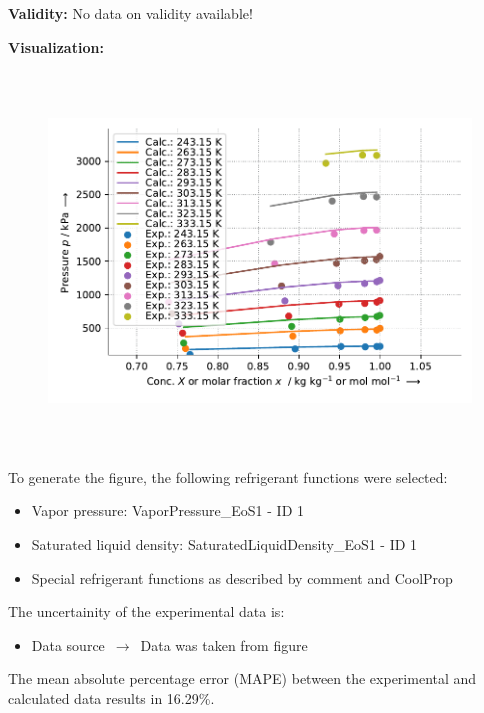 \textbf{Validity:}
\newline
No data on validity available!
\newline

\textbf{Visualization:}
%
\begin{figure}[!htp]
{\noindent\includegraphics[height=10cm, keepaspectratio]{figs/abs/abs_R-125_lubricant_POE_WilsonFixedDl_1.pdf}}
\end{figure}
%

To generate the figure, the following refrigerant functions were selected:
\begin{itemize}
\item Vapor pressure: VaporPressure\_EoS1 - ID 1
\item Saturated liquid density: SaturatedLiquidDensity\_EoS1 - ID 1
\item Special refrigerant functions as described by comment and CoolProp
\end{itemize}

The uncertainity of the experimental data is:
\begin{itemize}
\item Data source $\,\to\,$ Data was taken from figure
\end{itemize}

The mean absolute percentage error (MAPE) between the experimental and calculated data results in 16.29\%.
\FloatBarrier
\newpage
